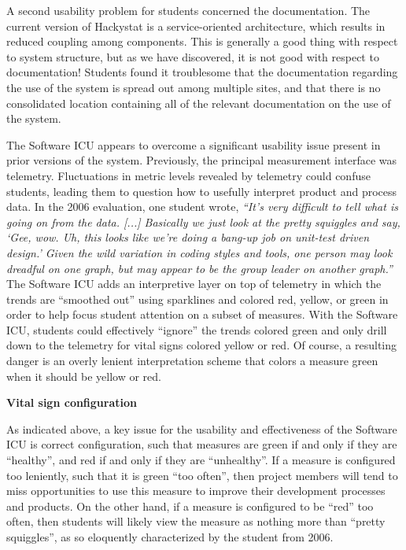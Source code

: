 \documentclass{acm_proc_article-sp}
\begin{document}
A second usability problem for students concerned the documentation.  The
current version of Hackystat is a service-oriented architecture, which
results in reduced coupling among components.  This is generally a good
thing with respect to system structure, but as we have discovered, it is
not good with respect to documentation!  Students found it troublesome that
the documentation regarding the use of the system is spread out among
multiple sites, and that there is no consolidated location containing all
of the relevant documentation on the use of the system.

The Software ICU appears to overcome a significant usability issue present
in prior versions of the system. Previously, the principal measurement
interface was telemetry.  Fluctuations in metric levels revealed by
telemetry could confuse students, leading them to question how to usefully
interpret product and process data.  In the 2006 evaluation, one student
wrote, {\em ``It's very difficult to tell what is going on from the
data. [...] Basically we just look at the pretty squiggles and say, `Gee,
wow. Uh, this looks like we're doing a bang-up job on unit-test driven
design.' Given the wild variation in coding styles and tools, one person
may look dreadful on one graph, but may appear to be the group leader on
another graph.''}  The Software ICU adds an interpretive layer on top of
telemetry in which the trends are ``smoothed out'' using sparklines and
colored red, yellow, or green in order to help focus student attention on a
subset of measures.  With the Software ICU, students could effectively
``ignore'' the trends colored green and only drill down to the telemetry
for vital signs colored yellow or red.  Of course, a resulting danger is an
overly lenient interpretation scheme that colors a measure green when it
should be yellow or red.

{\bf Vital sign configuration}

As indicated above, a key issue for the usability and effectiveness of the
Software ICU is correct configuration, such that measures are green if and
only if they are ``healthy'', and red if and only if they are
``unhealthy''.  If a measure is configured too leniently, such that it is
green ``too often'', then project members will tend to miss opportunities
to use this measure to improve their development processes and products.
On the other hand, if a measure is configured to be ``red'' too often, then
students will likely view the measure as nothing more than ``pretty
squiggles'', as so eloquently characterized by the student from 2006.
\end{document}
